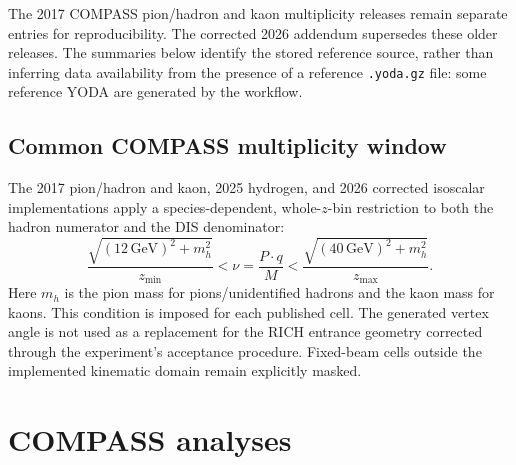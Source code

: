 \documentclass[11pt,a4paper]{article}
\newcommand{\GeV}{\mathrm{GeV}}
\begin{document}
The 2017 COMPASS pion/hadron and kaon multiplicity releases remain separate
entries for reproducibility. The corrected 2026 addendum supersedes these
older releases. The summaries below identify the stored reference source,
rather than inferring data availability from the presence of a reference
\texttt{.yoda.gz} file: some reference YODA are generated by the workflow.

\subsection*{Common COMPASS multiplicity window}
The 2017 pion/hadron and kaon, 2025 hydrogen, and 2026 corrected isoscalar
implementations apply a species-dependent, whole-$z$-bin restriction to both
the hadron numerator and the DIS denominator:
\begin{equation}
 \frac{\sqrt{(12\,\GeV)^2+m_h^2}}{z_{\min}}
 <\nu=\frac{P\cdot q}{M}<
 \frac{\sqrt{(40\,\GeV)^2+m_h^2}}{z_{\max}}.
 \label{eq:nu}
\end{equation}
Here $m_h$ is the pion mass for pions/unidentified hadrons and the kaon mass
for kaons. This condition is imposed for each published cell. The generated
vertex angle is not used as a replacement for the RICH entrance geometry
corrected through the experiment's acceptance procedure. Fixed-beam cells
outside the implemented kinematic domain remain explicitly masked.
\clearpage
\section{COMPASS analyses}
\end{document}
